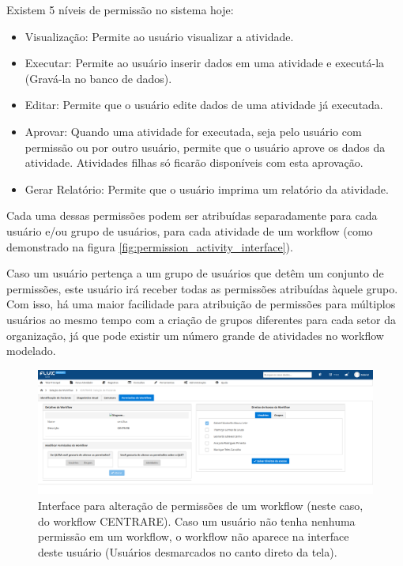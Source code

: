 Existem 5 níveis de permissão no sistema hoje:

\begin{itemize}
    \item Visualização: Permite ao usuário visualizar a atividade.
    \item Executar: Permite ao usuário inserir dados em uma atividade e executá-la (Gravá-la no banco de dados).
    \item Editar: Permite que o usuário edite dados de uma atividade já executada.
    \item Aprovar: Quando uma atividade for executada, seja pelo usuário com permissão ou por outro usuário, permite que o usuário aprove os dados da atividade. Atividades filhas só ficarão disponíveis com esta aprovação.
    \item Gerar Relatório: Permite que o usuário imprima um relatório da atividade.
\end{itemize}

Cada uma dessas permissões podem ser atribuídas separadamente para cada usuário e/ou grupo de usuários, para cada atividade de um workflow (como demonstrado na figura \ref{fig:permission_activity_interface}).

Caso um usuário pertença a um grupo de usuários que detêm um conjunto de permissões, este usuário irá receber todas as permissões atribuídas àquele grupo. Com isso, há uma maior facilidade para atribuição de permissões para múltiplos usuários ao mesmo tempo com a criação de grupos diferentes para cada setor da organização, já que pode existir um número grande de atividades no workflow modelado.

\begin{figure}
    \centering
    \includegraphics[width=\textwidth]{imgs/Flux/Permissoes/telaPermissoesCENTRARE.png}
    \caption{Interface para alteração de permissões de um workflow (neste caso, do workflow CENTRARE). Caso um usuário não tenha nenhuma permissão em um workflow, o workflow não aparece na interface deste usuário (Usuários desmarcados no canto direto da tela).}
    \label{fig:permission_interface}
\end{figure}

